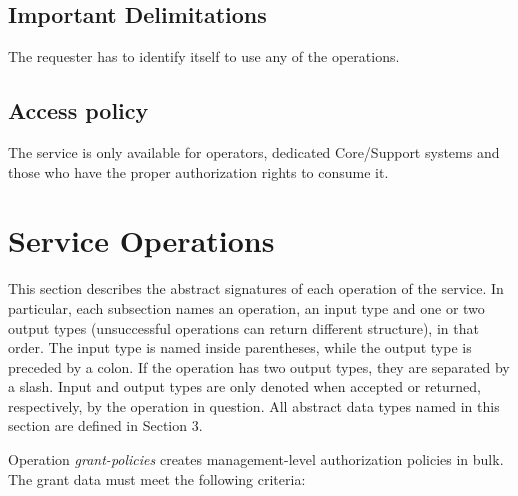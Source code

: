 \documentclass[a4paper]{arrowhead}
\begin{document}
\subsection{Important Delimitations}
\label{sec:delimitations}

The requester has to identify itself to use any of the operations.

\subsection{Access policy}
\label{sec:accesspolicy}

The service is only available for operators, dedicated Core/Support systems and those who have the proper authorization rights to consume it.

\newpage

\section{Service Operations}
\label{sec:functions}

This section describes the abstract signatures of each operation of the service. In particular, each subsection names an operation, an input type and one or two output types (unsuccessful operations can return different structure), in that order.
The input type is named inside parentheses, while the output type is preceded by a colon. If the operation has two output types, they are separated by a slash.
Input and output types are only denoted when accepted or returned, respectively, by the operation in question. All abstract data types named in this section are defined in Section 3.

{}

Operation \textit{grant-policies} creates management-level authorization policies in bulk. The grant data must meet the following criteria:
\end{document}

